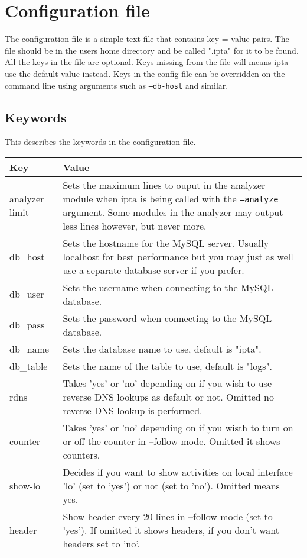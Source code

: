 \documentclass[english,twoside,openright,a4paper,12pt]{article}
\begin{document}
\section{Configuration file}

The configuration file is a simple text file that contains key = value
pairs. The file should be in the users home directory and be called
".ipta" for it to be found. All the keys in the file are optional.
Keys missing from the file will means ipta use the default value
instead. Keys in the config file can be overridden on the command line
using arguments such as \texttt{--db-host} and similar.

\subsection{Keywords}

This describes the keywords in the configuration file.

\begin{longtable}{|p{}|p{}|}
\hline Key & Value\\ \hline analyzer limit & Sets the maximum lines to
ouput in the analyzer module when ipta is being called with the
\texttt{--analyze} argument. Some modules in the analyzer may output
less lines however, but never more.\\ \hline

db\_host & Sets the hostname for the MySQL server. Usually localhost
for best performance but you may just as well use a separate database
server if you prefer.\\\hline

db\_user & Sets the username when connecting to the MySQL
database.\\\hline

db\_pass & Sets the password when connecting to the MySQL
database.\\\hline

db\_name & Sets the database name to use, default is "ipta".\\\hline

db\_table & Sets the name of the table to use, default is
"logs".\\\hline

rdns & Takes 'yes' or 'no' depending on if you wish to use reverse DNS
lookups as default or not. Omitted no reverse DNS lookup is
performed.\\\hline

counter & Takes 'yes' or 'no' depending on if you wisth to turn on or
off the counter in --follow mode. Omitted it shows counters. \\\hline

show-lo & Decides if you want to show activities on local interface
'lo' (set to 'yes') or not (set to 'no'). Omitted means yes.\\\hline

header & Show header every 20 lines in --follow mode (set to 'yes').
If omitted it shows headers, if you don't want headers set to
'no'.\\\hline


\end{longtable}
\end{document}
